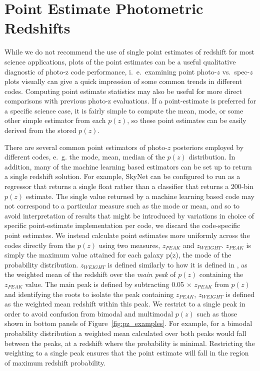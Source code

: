 \appendix

\section{Point Estimate Photometric Redshifts}
\label{sec:pointmetrics}
While we do not recommend the use of single point estimates of redshift for most science applications, plots of the point estimates can be a useful qualitative diagnostic of photo-z code performance, i.~e.~examining point photo-$z$ vs.~spec-$z$ plots visually can give a quick impression of some common trends in different codes.  Computing point estimate statistics may also be useful for more direct comparisons with previous photo-z evaluations.  If a point-estimate is preferred for a specific science case, it is fairly simple to compute the mean, mode, or some other simple estimator from each $p(z)$, so these point estimates can be easily derived from the stored $p(z)$.

There are several common point estimators of photo-$z$ posteriors employed by different codes, e.~g. the mode, mean, median of the $p(z)$ distribution.  In addition, many of the machine learning based estimators can be set up to return a single redshift solution.  For example, SkyNet can be configured to run as a regressor that returns a single float rather than a classifier that returns a 200-bin $p(z)$ estimate.  The single value returned by a machine learning based code may not correspond to a particular measure such as the mode or mean, and so to avoid interpretation of results that might be introduced by variations in choice of specific point-estimate implementation per code, we discard the code-specific point estimates. We instead calculate point estimates more uniformly across the codes directly from the $p(z)$ using two measures, $z_{PEAK}$ and $z_{WEIGHT}$.  $z_{PEAK}$  is simply the maximum value attained for each galaxy p(z), the mode of the probability distribution.  $z_{WEIGHT}$ is defined similarly to how it is defined in \citet{Dahlen:13}, as the weighted mean of the redshift over the {\it main peak} of $p(z)$ containing the $z_{PEAK}$ value.  The main peak is defined by subtracting 0.05$\,\times\,z_{PEAK}$ from $p(z)$ and identifying the roots to isolate the peak containing $z_{PEAK}$, $z_{WEIGHT}$ is defined as the weighted mean redshift within this peak.  We restrict to a single peak in order to avoid confusion from bimodal and multimodal $p(z)$ such as those shown in bottom panels of Figure~\ref{fig:pz_examples}.  For example, for a bimodal probability distribution a weighted mean calculated over both peaks would fall between the peaks, at a redshift where the probability is minimal. Restricting the weighting to a single peak ensures that the point estimate will fall in the region of maximum redshift probability. %

